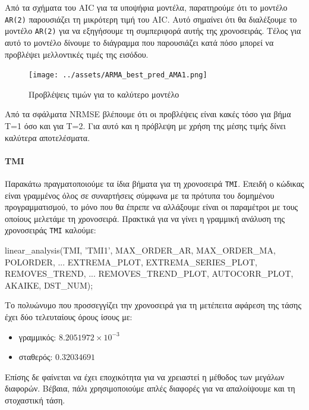 \documentclass[11pt,]{article}
\newenvironment{Shaded}{}{}
\newcommand{\NormalTok}[1]{#1}
\newcommand{\StringTok}[1]{\textcolor[rgb]{0.25,0.44,0.63}{#1}}
\providecommand{\tightlist}{%
  \setlength{\itemsep}{0pt}\setlength{\parskip}{0pt}}
\let\oldparagraph\paragraph
\renewcommand{\paragraph}[1]{\oldparagraph{#1}\mbox{}}
\begin{document}
Από τα σχήματα του AIC για τα υποψήφια μοντέλα, παρατηρούμε ότι το
μοντέλο \texttt{AR(2)} παρουσιάζει τη μικρότερη τιμή του AIC. Αυτό
σημαίνει ότι θα διαλέξουμε το μοντέλο \texttt{AR(2)} για να εξηγήσουμε
τη συμπεριφορά αυτής της χρονοσειράς. Τέλος για αυτό το μοντέλο δίνουμε
το διάγραμμα που παρουσιάζει κατά πόσο μπορεί να προβλέψει μελλοντικές
τιμές της εισόδου.

\begin{figure}
\centering
\texttt{[image: ../assets/ARMA\_best\_pred\_AMA1.png]}
\caption{Προβλέψεις τιμών για το καλύτερο μοντέλο}
\end{figure}

Από τα σφάλματα NRMSE βλέπουμε ότι οι προβλέψεις είναι κακές τόσο για
βήμα T=1 όσο και για T=2. Για αυτό και η πρόβλεψη με χρήση της μέσης
τιμής δίνει καλύτερα αποτελέσματα.

\hypertarget{tmi}{%
\paragraph{TMI}\label{tmi}}

Παρακάτω πραγματοποιούμε τα ίδια βήματα για τη χρονοσειρά \texttt{TMI}.
Επειδή ο κώδικας είναι γραμμένος όλος σε συναρτήσεις σύμφωνα με τα
πρότυπα του δομημένου προγραμματισμού, το μόνο που θα έπρεπε να
αλλάξουμε είναι οι παραμέτροι με τους οποίους μελετάμε τη χρονοσειρά.
Πρακτικά για να γίνει η γραμμική ανάλυση της χρονοσειράς \texttt{TMI}
καλούμε:

\begin{Shaded}
\begin{Highlighting}[]
\NormalTok{linear_analysis(TMI, }\StringTok{'TMI1'}\NormalTok{, MAX_ORDER_AR, MAX_ORDER_MA, POLORDER, ...}
\NormalTok{                EXTREMA_PLOT, EXTREMA_SERIES_PLOT, REMOVES_TREND, ...}
\NormalTok{                REMOVES_TREND_PLOT, AUTOCORR_PLOT, AKAIKE, DST_NUM);}
\end{Highlighting}
\end{Shaded}

Το πολυώνυμο που προσσεγγίζει την χρονοσειρά για τη μετέπειτα αφάρεση
της τάσης έχει δύο τελευταίους όρους ίσους με:

\begin{itemize}
\tightlist
\item
  γραμμικός: \(8.2051972\times 10^{-3}\)
\item
  σταθερός: \(0.32034691\)
\end{itemize}

Επίσης δε φαίνεται να έχει εποχικότητα για να χρειαστεί η μέθοδος των
μεγάλων διαφορών. Βέβαια, πάλι χρησιμοποιούμε απλές διαφορές για να
απαλοίψουμε και τη στοχαστική τάση.
\end{document}
